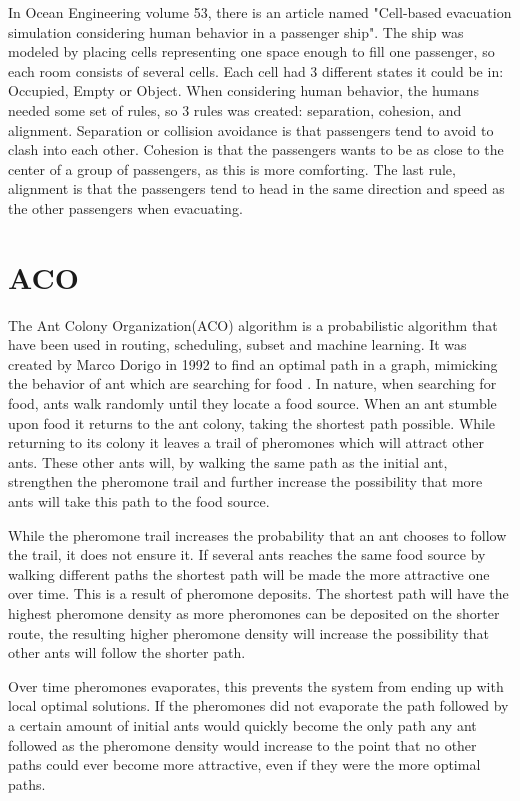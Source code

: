 In Ocean Engineering volume 53, there is an article named "Cell-based evacuation simulation considering human behavior in a passenger ship"\cite{celleva}. 
The ship was modeled by placing cells representing one space enough to fill one passenger, so each room consists of several cells. 
Each cell had 3 different states it could be in: Occupied, Empty or Object. When considering human behavior, the humans needed some set of rules, so 3 rules was created: separation, cohesion, and alignment. 
Separation or collision avoidance is that passengers tend to avoid to clash into each other. Cohesion is that the passengers wants to be as close to the center of a group of passengers, as this is more comforting. The last rule, alignment is that the passengers tend to head in the same direction and speed as the other passengers when evacuating.
 
 
\section{ACO}
The Ant Colony Organization(ACO) algorithm is a probabilistic algorithm that have been used in routing, scheduling, 
subset and machine learning. It was created by Marco Dorigo in 1992 to find an optimal path in a graph, mimicking the
behavior of ant which are searching for food \cite{aco}. In nature, when searching for food, ants walk randomly until
they locate a food source. When an ant stumble upon food it returns to the ant colony, taking the shortest path possible.
While returning to its colony it leaves a trail of pheromones which will attract other ants. These other ants will, by walking
the same path as the initial ant, strengthen the pheromone trail and further increase the possibility that more ants will
take this path to the food source.

While the pheromone trail increases the probability that an ant chooses to follow the trail, it does not ensure it.
If several ants reaches the same food source by walking different paths the shortest path will be made the more attractive
one over time. This is a result of pheromone deposits. The shortest path will have the highest pheromone density as more
pheromones can be deposited on the shorter route, the resulting higher pheromone density will increase the possibility that 
other ants will follow the shorter path. 

Over time pheromones evaporates, this prevents the system from ending up with local optimal solutions. 
If the pheromones did not evaporate the path followed by a certain amount of initial ants
would quickly become the only path any ant followed as the pheromone density would increase to the point that no other paths
could ever become more attractive, even if they were the more optimal paths. 

